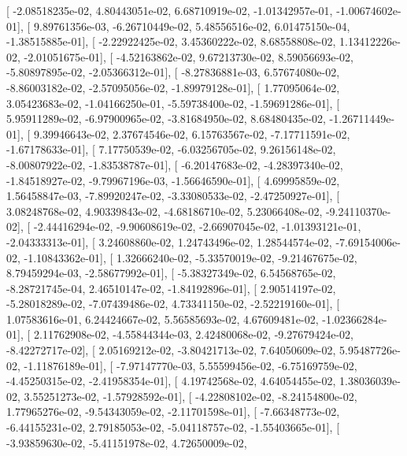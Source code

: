 \documentclass{article}
\begin{document}
       [ -2.08518235e-02,   4.80443051e-02,   6.68710919e-02,
         -1.01342957e-01,  -1.00674602e-01],
       [  9.89761356e-03,  -6.26710449e-02,   5.48556516e-02,
          6.01475150e-04,  -1.38515885e-01],
       [ -2.22922425e-02,   3.45360222e-02,   8.68558808e-02,
          1.13412226e-02,  -2.01051675e-01],
       [ -4.52163862e-02,   9.67213730e-02,   8.59056693e-02,
         -5.80897895e-02,  -2.05366312e-01],
       [ -8.27836881e-03,   6.57674080e-02,  -8.86003182e-02,
         -2.57095056e-02,  -1.89979128e-01],
       [  1.77095064e-02,   3.05423683e-02,  -1.04166250e-01,
         -5.59738400e-02,  -1.59691286e-01],
       [  5.95911289e-02,  -6.97900965e-02,  -3.81684950e-02,
          8.68480435e-02,  -1.26711449e-01],
       [  9.39946643e-02,   2.37674546e-02,   6.15763567e-02,
         -7.17711591e-02,  -1.67178633e-01],
       [  7.17750539e-02,  -6.03256705e-02,   9.26156148e-02,
         -8.00807922e-02,  -1.83538787e-01],
       [ -6.20147683e-02,  -4.28397340e-02,  -1.84518927e-02,
         -9.79967196e-03,  -1.56646590e-01],
       [  4.69995859e-02,   1.56458847e-03,  -7.89920247e-02,
         -3.33080533e-02,  -2.47250927e-01],
       [  3.08248768e-02,   4.90339843e-02,  -4.68186710e-02,
          5.23066408e-02,  -9.24110370e-02],
       [ -2.44416294e-02,  -9.90608619e-02,  -2.66907045e-02,
         -1.01393121e-01,  -2.04333313e-01],
       [  3.24608860e-02,   1.24743496e-02,   1.28544574e-02,
         -7.69154006e-02,  -1.10843362e-01],
       [  1.32666240e-02,  -5.33570019e-02,  -9.21467675e-02,
          8.79459294e-03,  -2.58677992e-01],
       [ -5.38327349e-02,   6.54568765e-02,  -8.28721745e-04,
          2.46510147e-02,  -1.84192896e-01],
       [  2.90514197e-02,  -5.28018289e-02,  -7.07439486e-02,
          4.73341150e-02,  -2.52219160e-01],
       [  1.07583616e-01,   6.24424667e-02,   5.56585693e-02,
          4.67609481e-02,  -1.02366284e-01],
       [  2.11762908e-02,  -4.55844344e-03,   2.42480068e-02,
         -9.27679424e-02,  -8.42272717e-02],
       [  2.05169212e-02,  -3.80421713e-02,   7.64050609e-02,
          5.95487726e-02,  -1.11876189e-01],
       [ -7.97147770e-03,   5.55599456e-02,  -6.75169759e-02,
         -4.45250315e-02,  -2.41958354e-01],
       [  4.19742568e-02,   4.64054455e-02,   1.38036039e-02,
          3.55251273e-02,  -1.57928592e-01],
       [ -4.22808102e-02,  -8.24154800e-02,   1.77965276e-02,
         -9.54343059e-02,  -2.11701598e-01],
       [ -7.66348773e-02,  -6.44155231e-02,   2.79185053e-02,
         -5.04118757e-02,  -1.55403665e-01],
       [ -3.93859630e-02,  -5.41151978e-02,   4.72650009e-02,
\end{document}
